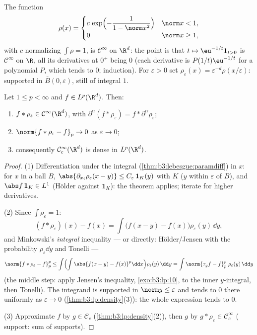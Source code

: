 \begin{definition}[Mollifiers]\label{def:b3:lp:mollifier}
The function
\[
\rho(x) = \begin{cases}
c\,\exp\Bigl(-\dfrac{1}{1 - \norm x^2}\Bigr) & \norm x < 1,\\
0 & \norm x \geq 1,
\end{cases}
\]
with $c$ normalizing $\int\rho = 1$, is $\mathcal C^\infty$ on
$\R^d$: the point is that $t \mapsto \eu^{-1/t}\mathbf
1_{t>0}$ is $\mathcal C^\infty$ on $\R$, all its derivatives at
$0^+$ being $0$ (each derivative is $P(1/t)\eu^{-1/t}$ for a
polynomial $P$, which tends to $0$; induction). For
$\varepsilon > 0$ set $\rho_\varepsilon(x) =
\varepsilon^{-d}\rho(x/\varepsilon)$: supported in $\bar B(0,
\varepsilon)$, still of integral $1$.
\end{definition}

\begin{theorem}[Regularization]\label{thm:b3:lp:regularization}
Let $1 \leq p < \infty$ and $f \in L^p(\R^d)$. Then:
\begin{enumerate}
  \item $f * \rho_\varepsilon \in \mathcal C^\infty(\R^d)$,
        with $\partial^\alpha(f * \rho_\varepsilon) = f *
        \partial^\alpha\rho_\varepsilon$;
  \item $\norm{f * \rho_\varepsilon - f}_p \to 0$ as
        $\varepsilon \to 0$;
  \item consequently $\mathcal C^\infty_c(\R^d)$ is dense in
        $L^p(\R^d)$.
\end{enumerate}
\end{theorem}

\begin{proof}
(1) Differentiation under the integral
(\cref{thm:b3:lebesgue:paramdiff}) in $x$: for $x$ in a ball
$B$, $\abs{\partial_{x_i}\rho_\varepsilon(x - y)} \leq
C_\varepsilon\,\mathbf 1_{K}(y)$ with $K$  ($y$ within
$\varepsilon$ of $B$), and $\abs f\,\mathbf 1_K \in L^1$
(H\"older against $\mathbf 1_K$): the theorem applies;
iterate for higher derivatives.

(2) Since $\int\rho_\varepsilon = 1$:
\[
(f * \rho_\varepsilon)(x) - f(x)
= \int \bigl(f(x - y) - f(x)\bigr)\rho_\varepsilon(y)\,\dd y ,
\]
and Minkowski's \emph{integral} inequality --- or directly:
H\"older/Jensen with the probability 
$\rho_\varepsilon\dd y$ and Tonelli ---
\[
\norm{f*\rho_\varepsilon - f}_p^p
\leq \int\Bigl(\int\abs{f(x-y) -
f(x)}^p\dd x\Bigr)\rho_\varepsilon(y)\,\dd y
= \int \norm{\tau_yf - f}_p^p\;\rho_\varepsilon(y)\,\dd y
\]
(the middle step: apply Jensen's inequality,
\cref{exo:b3:lp:10}, to the inner $y$-integral, then Tonelli).
The integrand is supported in $\norm y \leq \varepsilon$ and
tends to $0$ there uniformly as $\varepsilon \to 0$
(\cref{thm:b3:lp:density}(3)): the whole expression tends to
$0$.

(3) Approximate $f$ by $g \in \mathcal C_c$
(\cref{thm:b3:lp:density}(2)), then $g$ by $g *
\rho_\varepsilon \in \mathcal C_c^\infty$ ( support:
sum of supports).
\end{proof}

